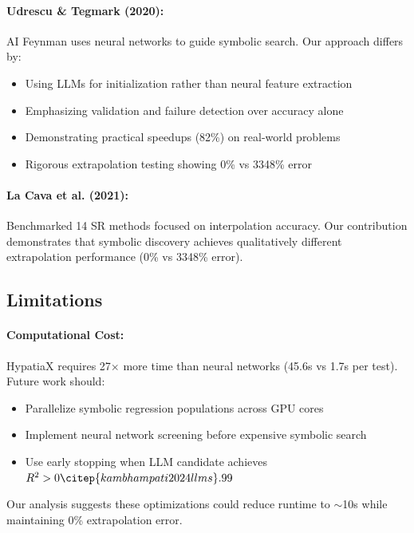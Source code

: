\documentclass[twoside,11pt]{article}
\begin{document}
\paragraph{Udrescu \& Tegmark (2020):} AI Feynman uses neural networks to guide symbolic search\citep{liu2020understanding}\citep{zhou2020universality}. Our approach differs by:
\begin{itemize}
\item Using LLMs for initialization rather than neural feature extraction\citep{kambhampati2024llms}
\item Emphasizing validation and failure detection over accuracy alone
\item Demonstrating practical speedups (82\%) on real-world problems
\item Rigorous extrapolation testing showing 0\% vs 3348\% error
\end{itemize}

\paragraph{La Cava et al. (2021):} Benchmarked 14 SR methods focused on interpolation accuracy. Our contribution demonstrates that symbolic discovery achieves qualitatively different extrapolation performance (0\% vs 3348\% error)\citep{koza1994genetic}.


\subsection{Limitations}

\paragraph{Computational Cost:} HypatiaX requires 27$\times$ more time than neural networks (45.6s vs 1.7s per test)\citep{zhou2020universality}\citep{liu2020understanding}. Future work should:
\begin{itemize}
\item Parallelize symbolic regression populations across GPU cores\citep{la2021contemporary}
\item Implement neural network screening before expensive symbolic search
\item Use early stopping when LLM candidate achieves $R^2 > 0\citep{kambhampati2024llms}.99$
\end{itemize}

Our analysis suggests these optimizations could reduce runtime to $\sim$10s while maintaining 0\% extrapolation error.
\end{document}
